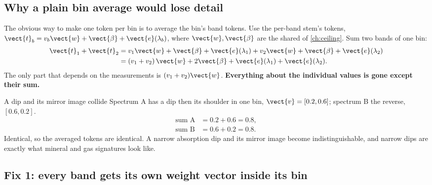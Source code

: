 
\subsection{Why a plain bin average would lose detail}

The obvious way to make one token per bin is to average the bin's band tokens. Use the per-band stem's tokens, $\vect{t}_b = v_b\vect{w} + \vect{\beta} + \vect{e}(\lambda_b)$, where $\vect{w}, \vect{\beta}$ are the shared  of \cref{ch:ceiling}. Sum two bands of one bin:
\begin{align*}
  \vect{t}_1 + \vect{t}_2 &= v_1\vect{w} + \vect{\beta} + \vect{e}(\lambda_1) + v_2\vect{w} + \vect{\beta} + \vect{e}(\lambda_2)\\
  &= (v_1 + v_2)\,\vect{w} + 2\vect{\beta} + \vect{e}(\lambda_1) + \vect{e}(\lambda_2).
\end{align*}
The only part that depends on the measurements is $(v_1 + v_2)\vect{w}$. \textbf{Everything about the individual values is gone except their sum.}

\begin{worked}[label={we:specdecoder:sumloss}]{A dip and its mirror image collide}
Spectrum A has a dip then its shoulder in one bin, $\vect{v} = [0.2, 0.6]$; spectrum B the reverse, $[0.6, 0.2]$.
\begin{align*}
  \text{sum A} &= 0.2 + 0.6 = 0.8,\\
  \text{sum B} &= 0.6 + 0.2 = 0.8 .
\end{align*}
Identical, so the averaged tokens are identical. A narrow absorption dip and its mirror image become indistinguishable, and narrow dips are exactly what mineral and gas signatures look like.
\end{worked}

\subsection{Fix 1: every band gets its own weight vector inside its bin}

